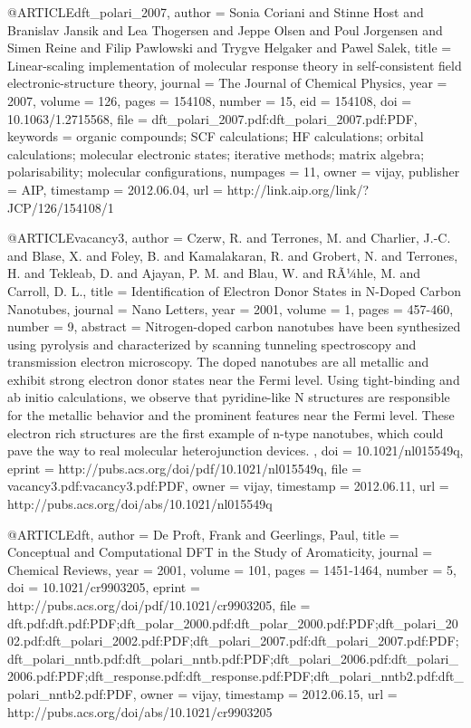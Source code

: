 @ARTICLE{dft_polari_2007,
  author = {Sonia Coriani and Stinne Host and Branislav Jansik and Lea Thogersen
	and Jeppe Olsen and Poul Jorgensen and Simen Reine and Filip Pawlowski
	and Trygve Helgaker and Pawel Salek},
  title = {Linear-scaling implementation of molecular response theory in self-consistent
	field electronic-structure theory},
  journal = {The Journal of Chemical Physics},
  year = {2007},
  volume = {126},
  pages = {154108},
  number = {15},
  eid = {154108},
  doi = {10.1063/1.2715568},
  file = {dft_polari_2007.pdf:dft_polari_2007.pdf:PDF},
  keywords = {organic compounds; SCF calculations; HF calculations; orbital calculations;
	molecular electronic states; iterative methods; matrix algebra; polarisability;
	molecular configurations},
  numpages = {11},
  owner = {vijay},
  publisher = {AIP},
  timestamp = {2012.06.04},
  url = {http://link.aip.org/link/?JCP/126/154108/1}
}

@ARTICLE{vacancy3,
  author = {Czerw, R. and Terrones, M. and Charlier, J.-C. and Blase, X. and
	Foley, B. and Kamalakaran, R. and Grobert, N. and Terrones, H. and
	Tekleab, D. and Ajayan, P. M. and Blau, W. and RÃ¼hle, M. and Carroll,
	D. L.},
  title = {Identification of Electron Donor States in N-Doped Carbon Nanotubes},
  journal = {Nano Letters},
  year = {2001},
  volume = {1},
  pages = {457-460},
  number = {9},
  abstract = { Nitrogen-doped carbon nanotubes have been synthesized using pyrolysis
	and characterized by scanning tunneling spectroscopy and transmission
	electron microscopy. The doped nanotubes are all metallic and exhibit
	strong electron donor states near the Fermi level. Using tight-binding
	and ab initio calculations, we observe that pyridine-like N structures
	are responsible for the metallic behavior and the prominent features
	near the Fermi level. These electron rich structures are the first
	example of n-type nanotubes, which could pave the way to real molecular
	heterojunction devices. },
  doi = {10.1021/nl015549q},
  eprint = {http://pubs.acs.org/doi/pdf/10.1021/nl015549q},
  file = {vacancy3.pdf:vacancy3.pdf:PDF},
  owner = {vijay},
  timestamp = {2012.06.11},
  url = {http://pubs.acs.org/doi/abs/10.1021/nl015549q}
}

@ARTICLE{dft,
  author = {De Proft, Frank and Geerlings, Paul},
  title = {Conceptual and Computational DFT in the Study of Aromaticity},
  journal = {Chemical Reviews},
  year = {2001},
  volume = {101},
  pages = {1451-1464},
  number = {5},
  doi = {10.1021/cr9903205},
  eprint = {http://pubs.acs.org/doi/pdf/10.1021/cr9903205},
  file = {dft.pdf:dft.pdf:PDF;dft_polar_2000.pdf:dft_polar_2000.pdf:PDF;dft_polari_2002.pdf:dft_polari_2002.pdf:PDF;dft_polari_2007.pdf:dft_polari_2007.pdf:PDF;dft_polari_nntb.pdf:dft_polari_nntb.pdf:PDF;dft_polari_2006.pdf:dft_polari_2006.pdf:PDF;dft_response.pdf:dft_response.pdf:PDF;dft_polari_nntb2.pdf:dft_polari_nntb2.pdf:PDF},
  owner = {vijay},
  timestamp = {2012.06.15},
  url = {http://pubs.acs.org/doi/abs/10.1021/cr9903205}
}

